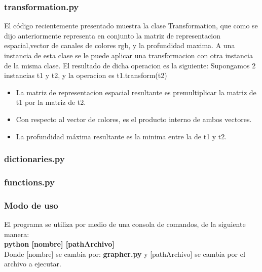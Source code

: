 \newpage
\subsubsection{transformation.py}



El c\'odigo recientemente presentado muestra la clase Transformation, que como se dijo anteriormente representa en conjunto la matriz de representacion espacial,vector de canales de colores rgb, y la profundidad maxima.
A una instancia de esta clase se le puede aplicar una transformacion con otra instancia de la misma clase. El resultado de dicha operacion es la siguiente:
Supongamos 2 instancias t1 y t2, y la operacion es t1.transform(t2)
\begin{itemize}
\item [] La matriz de representacion espacial resultante es premultiplicar la matriz de t1 por la matriz de t2. 
\item [] Con respecto al vector de colores, es el producto interno de ambos vectores.
\item [] La profundidad m\'axima resultante es la minima entre la de t1 y t2. 
\end{itemize}

\newpage
\subsubsection{dictionaries.py}


\newpage
\subsubsection{functions.py}



\newpage
\subsubsection{Modo de uso}
El programa se utiliza por medio de una consola de comandos, de la siguiente manera:\\
\textbf{ python [nombre] [pathArchivo]} \\ 
Donde [nombre] se cambia por: \textbf{grapher.py}
y [pathArchivo] se cambia por el archivo a ejecutar.
